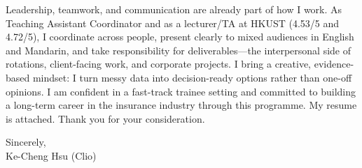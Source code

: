 \documentclass[11pt,letterpaper]{article}
\begin{document}
Leadership, teamwork, and communication are already part of how I work. As Teaching Assistant Coordinator and as a lecturer/TA at HKUST (4.53/5 and 4.72/5), I coordinate across people, present clearly to mixed audiences in English and Mandarin, and take responsibility for deliverables---the interpersonal side of rotations, client-facing work, and corporate projects. I bring a creative, evidence-based mindset: I turn messy data into decision-ready options rather than one-off opinions. I am confident in a fast-track trainee setting and committed to building a long-term career in the insurance industry through this programme. My resume is attached. Thank you for your consideration.

\vspace{0.3em}
Sincerely,\\[0.25em]
Ke-Cheng Hsu (Clio)
\end{document}
